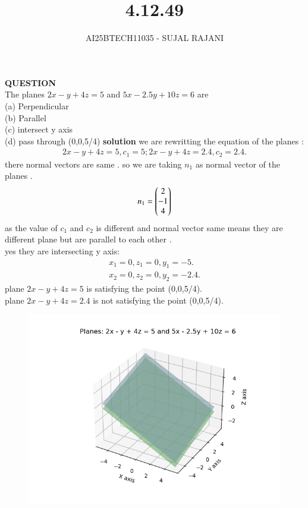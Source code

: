 \documentclass[journal,12pt,onecolumn]{IEEEtran}
\begin{document}
\title{4.12.49}
\author{AI25BTECH11035 - SUJAL RAJANI}
{\let\newpage\relax\maketitle}
\textbf{QUESTION}
\\
   The planes $2 x-y+4 z=5$ and $5x-2.5 y +10 z=6$ are 
   \\
   (a) Perpendicular
\\
   (b) Parallel
  \\
  (c) intersect y axis
  \\
   (d) pass through (0,0,5/4)
\textbf{solution}
we are rewritting the equation of the planes :
\begin{align*}
    2x-y+4z=5,c_1=5;2x-y+4z=2.4,c_2=2.4.
\end{align*}
there normal vectors are same .
so we are taking $n_1$ as normal vector of the planes .
\begin{align*}
   n_1=\begin{pmatrix}2\\-1\\4\end{pmatrix}
\end{align*}
as the value of $c_1$ and  $c_2$ is different and normal vector same means they are different plane but are parallel to each other .
\\
yes they are intersecting y axis:
\begin{align*}
    x_1=0,z_1=0,y_1=-5.
\\
  x_2=0,z_2=0,y_2=-2.4.
\end{align*}
plane $2x-y+4z=5$ is satisfying the point (0,0,5/4).
\\
plane $2x-y+4z=2.4 $ is not satisfying the point (0,0,5/4).
        \begin{figure}[H]
    \centering
    \includegraphics[width = 0.7\columnwidth]{figs/img.png}
    \caption*{}
    \label{figs}
\end{figure}
\end{document}
